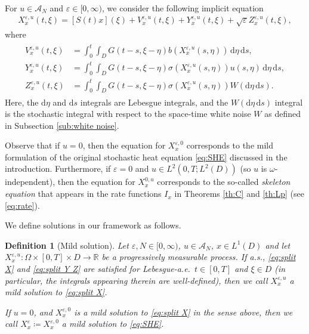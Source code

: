 \documentclass[10pt,a4paper]{amsart}
\newtheorem{definition}[theorem]{Definition}
\numberwithin{equation}{section}
\newcommand{\R}{\mathbb{R}}
\newcommand{\ceqq}{\coloneqq}
\newcommand{\col}{\colon}
\newcommand{\eps}{\varepsilon}
\newcommand{\Om}{\Omega}
\newcommand{\om}{\omega}
\newcommand{\A}{{\mathcal A}}
\newcommand{\dd}{\,\mathrm{d}}
\newcommand{\ddd}{\mathrm{d}}
\begin{document}
For $u\in \A_N$ and $\eps\in[0,\infty)$, we consider the following implicit equation 
\begin{align}\label{eq:split X}
  X_x^{\eps,u}(t,\xi) = [S(t)x](\xi)+V^{\eps,u}_x(t,\xi)+Y_x^{\eps,u}(t,\xi)+\sqrt{\eps}Z_x^{\eps,u}(t,\xi),
\end{align}
where  
\begin{align}\label{eq:split Y Z}
\begin{split}
V^{\eps,u}_x(t,\xi) &=  
  \int_0^t \int_D G(t-s,\xi-\eta)b(X_x^{\eps,u}(s,\eta))\dd \eta\dd s, \\
  Y_x^{\eps,u}(t,\xi) &=  
  \int_0^t \int_D G(t-s,\xi-\eta)\sigma(X_x^{\eps,u}(s,\eta))u(s,\eta)\dd \eta\dd s, \\
  Z_x^{\eps,u}(t,\xi) &=   
  \int_0^t\int_D G(t-s,\xi-\eta)\sigma(X_x^{\eps,u}(s,\eta))W(\ddd\eta\dd s). \end{split}
\end{align}
Here, the $\ddd \eta$ and $\ddd s$ integrals are Lebesgue integrals, and the $W(\ddd\eta\dd s)$ integral is the stochastic integral with respect to the space-time white noise $W$ as defined in Subsection \ref{sub:white noise}. 

Observe that if $u=0$, then the equation for $X_x^{\eps,0}$ corresponds to the mild  formulation of the original stochastic heat equation \eqref{eq:SHE} discussed in the introduction. Furthermore, if $\eps=0$ and $u\in L^2(0,T;L^2(D))$ (so $u$ is $\om$-independent), then the equation for $X_x^{0,u}$ corresponds to  the so-called \emph{skeleton equation} that appears in the rate functions $I_x$ in Theorems \ref{th:C} and \ref{th:Lp} (see \eqref{eq:rate}). 

We define solutions in our framework as follows. 
 
\begin{definition}[Mild solution]\label{def:sol}
Let $\eps,N\in[0,\infty)$, $u\in \A_N$, $x\in L^1(D)$ and let $X_x^{\eps,u}\col \Om\times [0,T]\times D\to \R$ be a progressively measurable  process. 
If a.s., \eqref{eq:split X} and \eqref{eq:split Y Z} are  satisfied for Lebesgue-a.e.\ $t\in[0,T]$ and $\xi\in D$ (in particular, the integrals appearing therein are well-defined), then we call $X_x^{\eps,u}$ a \emph{mild solution to \eqref{eq:split X}}. 

If $u=0$, and $X_x^{\eps,0}$ is a mild solution to \eqref{eq:split X} in the sense above, then we call $X_x^\eps\ceqq X_x^{\eps,0}$ a mild solution to \eqref{eq:SHE}.
\end{definition}
\end{document}
